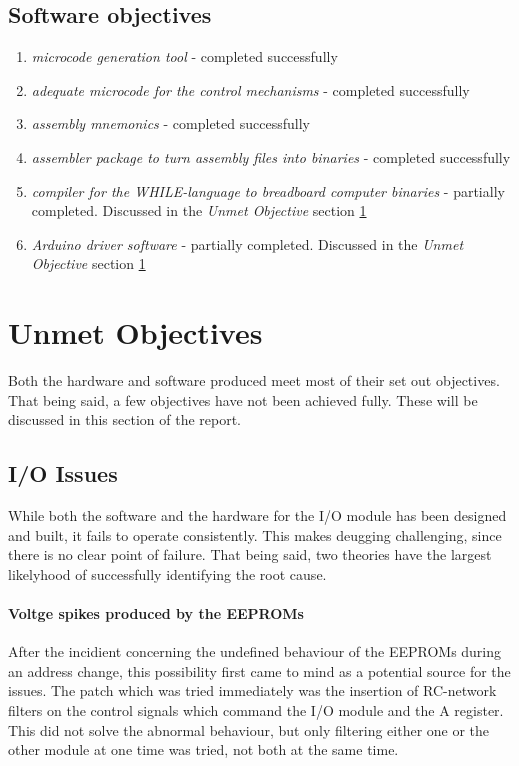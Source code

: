 \subsection{Software objectives}
\begin{enumerate}
  \item \emph{microcode generation tool} - completed successfully
  \item \emph{adequate microcode for the control mechanisms} - completed successfully
  \item \emph{assembly mnemonics} - completed successfully
  \item \emph{assembler package to turn assembly files into binaries} - completed successfully
  \item \emph{compiler for the WHILE-language to breadboard computer binaries} - partially completed.
  Discussed in the \emph{Unmet Objective} section \ref{unmet}
  \item \emph{Arduino driver software} - partially completed.
  Discussed in the \emph{Unmet Objective} section \ref{unmet}
\end{enumerate}

\section{Unmet Objectives} \label{unmet}
Both the hardware and software produced meet most of their set out objectives. That being said, a few
objectives have not been achieved fully. These will be discussed in this section of the report.

\subsection{I/O Issues}
While both the software and the hardware for the I/O module has been designed and built, it fails
to operate consistently. This makes deugging challenging, since there is no clear point of failure.
That being said, two theories have the largest likelyhood of successfully identifying the root cause.

\paragraph{Voltge spikes produced by the EEPROMs} After the incidient concerning the undefined
behaviour of the EEPROMs during an address change, this possibility first came to mind as a potential
source for the issues. The patch which was tried immediately was the insertion of RC-network filters
on the control signals which command the I/O module and the A register. This did not solve the abnormal
behaviour, but only filtering either one or the other module at one time was tried, not both at the
same time.

